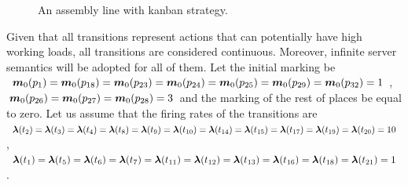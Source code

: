 \begin{figure}[!hbt]
    \caption[]{An assembly line with kanban strategy.}
   \label{cas:f-fmsmod}
\end{figure}

Given that all transitions represent actions that can potentially have
high working loads, all transitions are considered continuous.
Moreover, infinite server semantics will be adopted for all of them. Let
the initial marking be $\mo(p_1)=\mo(p_{18})=\mo(p_{23})=\mo(p_{24})=\mo(p_{25})=\mo(p_{29})=\mo(p_{32})=1$,
$\mo(p_{26})=\mo(p_{27})=\mo(p_{28})=3$ and the marking of the
rest of places be equal to zero. Let us assume that the firing rates of the transitions are
$\la(t_2)=\la(t_3)=\la(t_4)=\la(t_8)=\la(t_9)=\la(t_{10})=\la(t_{14})=\la(t_{15})=\la(t_{17})=\la(t_{19})=\la(t_{20})=10$,
$\la(t_1)=\la(t_5)=\la(t_6)=\la(t_7)=\la(t_{11})=\la(t_{12})=\la(t_{13})=\la(t_{16})=\la(t_{18})=\la(t_{21})=1$.

